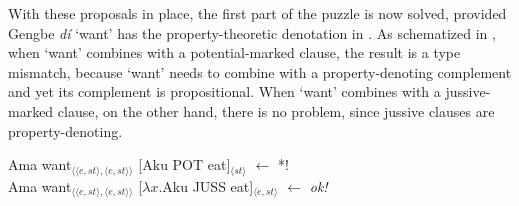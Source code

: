 \documentclass[output=paper,modfonts,nonflat]{langsci/langscibook}
\begin{document}

With these proposals in place, the first part of the puzzle is now solved, provid\-ed Gengbe \emph{d{\Z}\'i} `want' has the property-theoretic denotation in . As schematized in , when `want' combines with a potential-marked clause, the result is a type mismatch, because `want' needs to combine with a property-denoting complement and yet its complement is propositional. When `want' combines with a jussive-marked clause, on the other hand, there is no problem, since jussive clauses are property-denoting.


\ea \label{ex:grano:p1s:27}
    \begin{xlist}
    \ex Ama want$_{\langle\langle e,st\rangle,\langle e,st\rangle\rangle}$ [Aku POT eat]$_{\langle st\rangle}$  \hfill $\leftarrow$ *!\\
    \ex Ama want$_{\langle\langle e,st\rangle,\langle e,st\rangle\rangle}$ [$\lambda x$.Aku JUSS eat]$_{\langle e,st\rangle}$   \hfill $\leftarrow$ \emph{ok!} 
    \end{xlist}
\z
\end{document}

